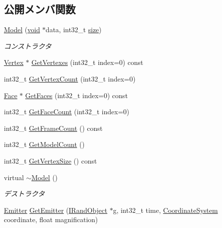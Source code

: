 \subsection*{公開メンバ関数}
\begin{DoxyCompactItemize}
\item 
\mbox{\hyperlink{class_effekseer_1_1_model_a6e13732e632a25f8368b698b9c21e61d}{Model}} (\mbox{\hyperlink{namespace_effekseer_ab34c4088e512200cf4c2716f168deb56}{void}} $\ast$data, int32\+\_\+t \mbox{\hyperlink{namespace_effekseer_a73c68f3d33539d30844b9d1e058077f7}{size}})
\begin{DoxyCompactList}\small\item\em コンストラクタ \end{DoxyCompactList}\item 
\mbox{\hyperlink{struct_effekseer_1_1_model_1_1_vertex}{Vertex}} $\ast$ \mbox{\hyperlink{class_effekseer_1_1_model_a6116c0656bbf40185805e949243eef51}{Get\+Vertexes}} (int32\+\_\+t index=0) const
\item 
int32\+\_\+t \mbox{\hyperlink{class_effekseer_1_1_model_a63308d170d52e2b12fd1a479f5e6ccf1}{Get\+Vertex\+Count}} (int32\+\_\+t index=0)
\item 
\mbox{\hyperlink{struct_effekseer_1_1_model_1_1_face}{Face}} $\ast$ \mbox{\hyperlink{class_effekseer_1_1_model_aca53194432e229643e98ecfd9b3d9db9}{Get\+Faces}} (int32\+\_\+t index=0) const
\item 
int32\+\_\+t \mbox{\hyperlink{class_effekseer_1_1_model_af97bcb7a69056a947dc539d9c4af131b}{Get\+Face\+Count}} (int32\+\_\+t index=0)
\item 
int32\+\_\+t \mbox{\hyperlink{class_effekseer_1_1_model_a7d4897bc5dffe71d6814a99b32b57c16}{Get\+Frame\+Count}} () const
\item 
int32\+\_\+t \mbox{\hyperlink{class_effekseer_1_1_model_ad91886d20e51178e39575730791d011f}{Get\+Model\+Count}} ()
\item 
int32\+\_\+t \mbox{\hyperlink{class_effekseer_1_1_model_a7bec54c23ed23793809d05c229dc8bf2}{Get\+Vertex\+Size}} () const
\item 
virtual \mbox{\hyperlink{class_effekseer_1_1_model_a02266837426d39149d3eb56da7051c98}{$\sim$\+Model}} ()
\begin{DoxyCompactList}\small\item\em デストラクタ \end{DoxyCompactList}\item 
\mbox{\hyperlink{struct_effekseer_1_1_model_1_1_emitter}{Emitter}} \mbox{\hyperlink{class_effekseer_1_1_model_a42ec48630c9d7f8d0232777102bffe9a}{Get\+Emitter}} (\mbox{\hyperlink{class_effekseer_1_1_i_rand_object}{I\+Rand\+Object}} $\ast$g, int32\+\_\+t time, \mbox{\hyperlink{namespace_effekseer_ac8508f8823c5fcf36aac5d2ddee23765}{Coordinate\+System}} coordinate, float magnification)

\end{DoxyCompactItemize}
